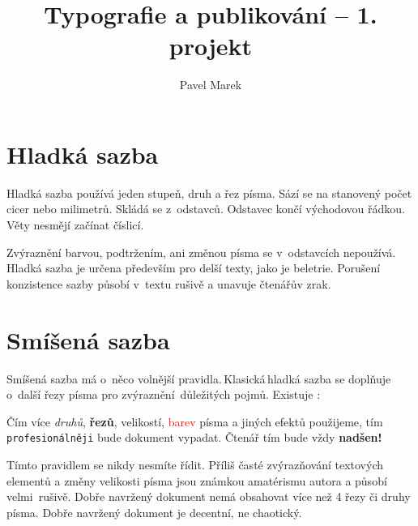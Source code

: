 \documentclass[a4paper, 10pt, twocolumn]{article}
\title{Typografie a publikování – 1. projekt}
\author{Pavel Marek}
\begin{document}



\section{Hladká sazba}
Hladká sazba používá jeden stupeň, druh a řez písma. Sází se na stanovený počet cicer nebo milimetrů. Skládá se z~odstavců.
Odstavec končí východovou řádkou.
Věty nesmějí začínat číslicí.

Zvýraznění barvou, podtržením, ani změnou písma se v~odstavcích nepoužívá.
Hladká sazba je určena především pro delší texty, jako je beletrie.
Porušení konzistence sazby působí v~textu rušivě a unavuje čtenářův zrak.

\section{Smíšená sazba} 
Smíšená sazba má o~něco volnější pravidla.\,Klasická\,hladká sazba se doplňuje o~další řezy písma pro zvýraznění~důle\-žitých pojmů.
Existuje :


    \begin{adjustwidth}{0.8cm}{0.7cm}
		\medskip
		\setlength{\parindent}{0.34cm}
		\hspace{\parindent}
		Čím více {\it druhů}, \textbf{řezů}, {\tiny velikostí}, \textcolor{red}{barev} písma a jiných {\sc efektů} použijeme,
		tím {\tt profesionálněji} bude {\Large{\selectfont dokument}} vypadat.
		{\huge Č}{\LARGE t}{\Large e}{\large n}á{\small ř} {\footnotesize t}{\scriptsize í}{\tiny m} bude vždy {\Huge\bf nadšen!}
		\medskip
	\end{adjustwidth}

{\sc Tímto pravidlem se nikdy nesmíte řídit.}
Příliš časté zvýrazňování textových elementů a změny velikosti písma jsou známkou amatérismu autora a působí velmi~ru\-šivě.
Dobře navržený dokument nemá obsahovat více než 4 řezy či druhy písma.
Dobře navržený dokument je decentní, ne chaotický.
\end{document}
